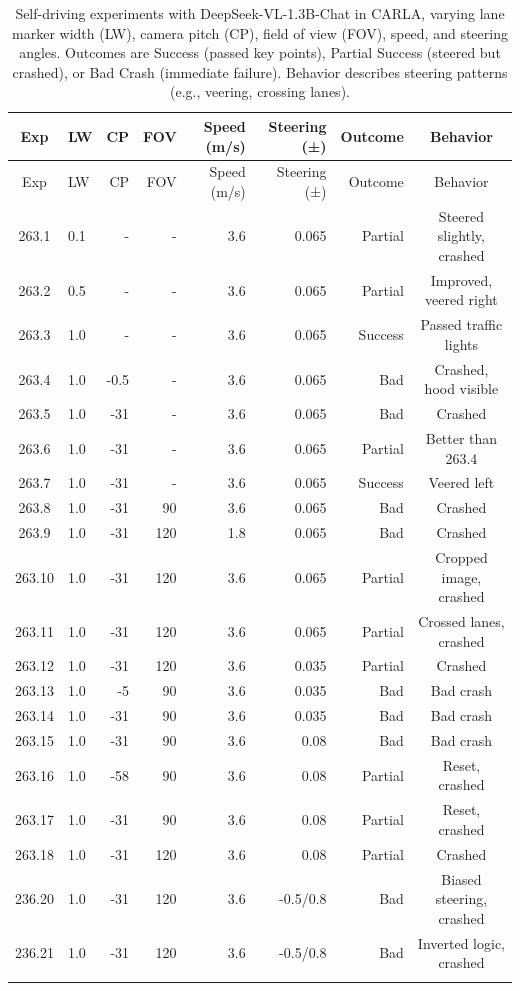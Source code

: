 \begin{longtable}{@{}clrrrrrc@{}}
\toprule
Exp & LW & CP & FOV & Speed (m/s) & Steering (±) & Outcome & Behavior \\
\midrule
\endfirsthead
\toprule
Exp & LW & CP & FOV & Speed (m/s) & Steering (±) & Outcome & Behavior \\
\midrule
\endhead
263.1 & 0.1 & - & - & 3.6 & 0.065 & Partial & Steered slightly, crashed \\
263.2 & 0.5 & - & - & 3.6 & 0.065 & Partial & Improved, veered right \\
263.3 & 1.0 & - & - & 3.6 & 0.065 & Success & Passed traffic lights \\
263.4 & 1.0 & -0.5 & - & 3.6 & 0.065 & Bad & Crashed, hood visible \\
263.5 & 1.0 & -31 & - & 3.6 & 0.065 & Bad & Crashed \\
263.6 & 1.0 & -31 & - & 3.6 & 0.065 & Partial & Better than 263.4 \\
263.7 & 1.0 & -31 & - & 3.6 & 0.065 & Success & Veered left \\
263.8 & 1.0 & -31 & 90 & 3.6 & 0.065 & Bad & Crashed \\
263.9 & 1.0 & -31 & 120 & 1.8 & 0.065 & Bad & Crashed \\
263.10 & 1.0 & -31 & 120 & 3.6 & 0.065 & Partial & Cropped image, crashed \\
263.11 & 1.0 & -31 & 120 & 3.6 & 0.065 & Partial & Crossed lanes, crashed \\
263.12 & 1.0 & -31 & 120 & 3.6 & 0.035 & Partial & Crashed \\
263.13 & 1.0 & -5 & 90 & 3.6 & 0.035 & Bad & Bad crash \\
263.14 & 1.0 & -31 & 90 & 3.6 & 0.035 & Bad & Bad crash \\
263.15 & 1.0 & -31 & 90 & 3.6 & 0.08 & Bad & Bad crash \\
263.16 & 1.0 & -58 & 90 & 3.6 & 0.08 & Partial & Reset, crashed \\
263.17 & 1.0 & -31 & 90 & 3.6 & 0.08 & Partial & Reset, crashed \\
263.18 & 1.0 & -31 & 120 & 3.6 & 0.08 & Partial & Crashed \\
236.20 & 1.0 & -31 & 120 & 3.6 & -0.5/0.8 & Bad & Biased steering, crashed \\
236.21 & 1.0 & -31 & 120 & 3.6 & -0.5/0.8 & Bad & Inverted logic, crashed \\
\bottomrule
\caption{Self-driving experiments with DeepSeek-VL-1.3B-Chat in CARLA, varying lane marker width (LW), camera pitch (CP), field of view (FOV), speed, and steering angles. Outcomes are Success (passed key points), Partial Success (steered but crashed), or Bad Crash (immediate failure). Behavior describes steering patterns (e.g., veering, crossing lanes).}
\label{tab:deepseek_self_driving}
\end{longtable}

